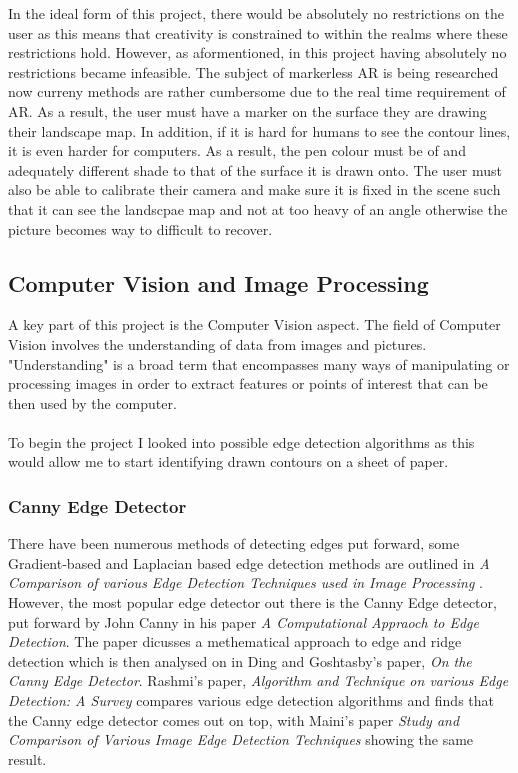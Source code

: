 \documentclass[11pt]{article}
\begin{document}
In the ideal form of this project, there would be absolutely no
restrictions on the user as this means that creativity is constrained
to within the realms where these restrictions hold. However, as 
aformentioned, in this project having absolutely no restrictions became
infeasible. The subject of markerless AR is being researched now curreny 
methods are rather cumbersome due to the real time requirement of AR. As
a result, the user must have a marker on the surface they are drawing their
landscape map. In addition, if it is hard for humans to see the contour
lines, it is even harder for computers. As a result, the pen colour must
be of and adequately different shade to that of the surface it is drawn onto.
The user must also be able to calibrate their camera and make sure it
is fixed in the scene such that it can see the landscpae map and not at
too heavy of an angle otherwise the picture becomes way to difficult to 
recover.


\subsection{Computer Vision and Image Processing}
A key part of this project is the Computer Vision aspect. The field of
Computer Vision involves the understanding of data from images and pictures.
"Understanding" is a broad term that encompasses many ways of manipulating or
processing images in order to extract features or points of interest that
can be then used by the computer. \\
\\
To begin the project I looked into possible edge detection algorithms as 
this would allow me to start identifying drawn contours on a sheet of paper.

\subsubsection{Canny Edge Detector}
\label{sec:Canny}
There have been numerous methods of detecting edges put forward,
some Gradient-based and Laplacian based edge detection methods are 
outlined in 
\textit{A Comparison of various Edge Detection Techniques used in Image Processing}
\cite{Shriv12}. However, the most popular edge detector out there is the
Canny Edge detector, put forward by John Canny in his paper
\textit{A Computational Appraoch to Edge Detection}\cite{Canny86}. The paper
dicusses a methematical approach to edge and ridge detection which is then
analysed on in Ding and Goshtasby's paper, 
\textit{On the Canny Edge Detector}\cite{Ding00}. Rashmi's paper,
\textit{Algorithm and Technique on various Edge Detection: A Survey}
\cite{Rashmi13} compares various edge detection algorithms and finds that 
the Canny edge detector comes out on top, with Maini's paper 
\textit{Study and Comparison of Various Image Edge Detection Techniques} 
\cite{Maini} showing the same result.
\end{document}
